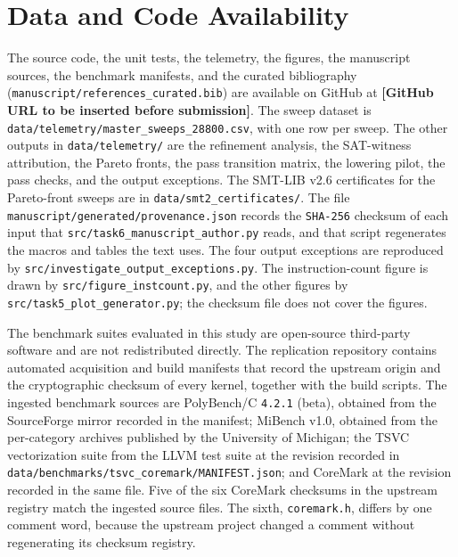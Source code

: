 \section*{Data and Code Availability}

The source code, the unit tests, the telemetry, the figures, the manuscript sources, the benchmark manifests, and the curated bibliography (\texttt{manuscript/\allowbreak{}references\_\allowbreak{}curated.bib}) are available on GitHub at \textbf{[GitHub URL to be inserted before submission]}. The sweep dataset is \texttt{data/\allowbreak{}telemetry/\allowbreak{}master\_\allowbreak{}sweeps\_\allowbreak{}28800.csv}, with one row per sweep. The other outputs in \texttt{data/\allowbreak{}telemetry/} are the refinement analysis, the SAT-witness attribution, the Pareto fronts, the pass transition matrix, the lowering pilot, the pass checks, and the output exceptions. The SMT-LIB v2.6 certificates for the Pareto-front sweeps are in \texttt{data/\allowbreak{}smt2\_\allowbreak{}certificates/}. The file \texttt{manuscript/\allowbreak{}generated/\allowbreak{}provenance.json} records the \texttt{SHA-256} checksum of each input that \texttt{src/\allowbreak{}task6\_\allowbreak{}manuscript\_\allowbreak{}author.py} reads, and that script regenerates the macros and tables the text uses. The four output exceptions are reproduced by \texttt{src/\allowbreak{}investigate\_\allowbreak{}output\_\allowbreak{}exceptions.py}. The instruction-count figure is drawn by \texttt{src/\allowbreak{}figure\_\allowbreak{}instcount.py}, and the other figures by \texttt{src/\allowbreak{}task5\_\allowbreak{}plot\_\allowbreak{}generator.py}; the checksum file does not cover the figures.

The benchmark suites evaluated in this study are open-source third-party software and are not redistributed directly. The replication repository contains automated acquisition and build manifests that record the upstream origin and the cryptographic checksum of every kernel, together with the build scripts. The ingested benchmark sources are PolyBench/C \texttt{4.\allowbreak{}2.\allowbreak{}1} (beta), obtained from the SourceForge mirror recorded in the manifest; MiBench v1.0, obtained from the per-category archives published by the University of Michigan; the TSVC vectorization suite from the LLVM test suite at the revision recorded in \texttt{data/\allowbreak{}benchmarks/\allowbreak{}tsvc\_coremark/\allowbreak{}MANIFEST.json}; and CoreMark at the revision recorded in the same file. Five of the six CoreMark checksums in the upstream registry match the ingested source files. The sixth, \texttt{coremark.\allowbreak{}h}, differs by one comment word, because the upstream project changed a comment without regenerating its checksum registry.

